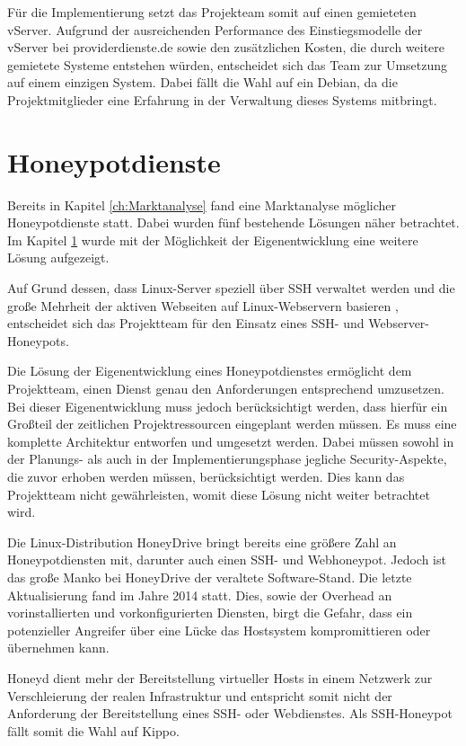 Für die Implementierung setzt das Projekteam somit auf einen gemieteten vServer. Aufgrund der ausreichenden Performance des Einstiegsmodelle der vServer bei providerdienste.de sowie den zusätzlichen Kosten, die durch weitere gemietete Systeme entstehen würden, entscheidet sich das Team zur Umsetzung auf einem einzigen System. Dabei fällt die Wahl auf ein Debian, da die Projektmitglieder eine Erfahrung in der Verwaltung dieses Systems mitbringt.\\

\section{Honeypotdienste}
\label{sec:Honeypotdienste}

Bereits in Kapitel \ref{ch:Marktanalyse} fand eine Marktanalyse möglicher Honeypotdienste statt. Dabei wurden fünf bestehende Lösungen näher betrachtet. Im Kapitel \ref{sec:Honeypotdienste} wurde mit der Möglichkeit der Eigenentwicklung eine weitere Lösung aufgezeigt.

Auf Grund dessen, dass Linux-Server speziell über SSH verwaltet werden und die große Mehrheit der aktiven Webseiten auf Linux-Webservern basieren \cite{w3techs16}, entscheidet sich das Projektteam für den Einsatz eines SSH- und Webserver-Honeypots.

Die Lösung der Eigenentwicklung eines Honeypotdienstes ermöglicht dem Projektteam, einen Dienst genau den Anforderungen entsprechend umzusetzen. Bei dieser Eigenentwicklung muss jedoch berücksichtigt werden, dass hierfür ein Großteil der zeitlichen Projektressourcen eingeplant werden müssen. Es muss eine komplette Architektur entworfen und umgesetzt werden. Dabei müssen sowohl in der Planungs- als auch in der Implementierungsphase jegliche Security-Aspekte, die zuvor erhoben werden müssen, berücksichtigt werden. Dies kann das Projektteam nicht gewährleisten, womit diese Lösung nicht weiter betrachtet wird.


Die Linux-Distribution HoneyDrive bringt bereits eine größere Zahl an Honeypotdiensten mit, darunter auch einen SSH- und Webhoneypot. Jedoch ist das große Manko bei HoneyDrive der veraltete Software-Stand. Die letzte Aktualisierung fand im Jahre 2014 statt. Dies, sowie der Overhead an vorinstallierten und vorkonfigurierten Diensten, birgt die Gefahr, dass ein potenzieller Angreifer über eine Lücke das Hostsystem kompromittieren oder übernehmen kann.

Honeyd dient mehr der Bereitstellung virtueller Hosts in einem Netzwerk zur Verschleierung der realen Infrastruktur und entspricht somit nicht der Anforderung der Bereitstellung eines SSH- oder Webdienstes. Als SSH-Honeypot fällt somit die Wahl auf Kippo.


